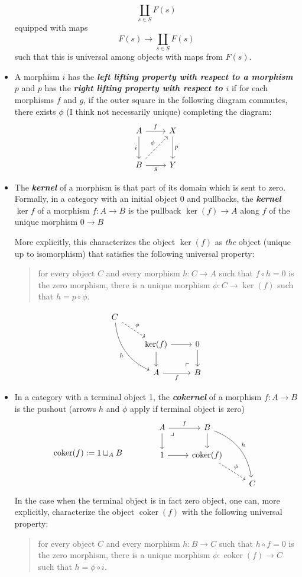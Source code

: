 \documentclass{article}
\numberwithin{equation}{section}
\DeclareMathOperator{\coker}{coker}
\begin{document}
\begin{defn}
\begin{itemize}
\begin{remark}
			\[\coprod_{s\in S}F(s)\]
			equipped with maps
			\[F(s)\to\coprod_{s\in S}F(s)\]
			such that this is universal among objects with maps from $F(s)$.
		\end{remark}
		\item A morphism $i$ has the \textbf{\textit{left lifting property with respect to a morphism $p$}} and $p$ has the \textbf{\textit{right lifting property with respect to $i$}} if for each morphisms $f$ and $g$, if the outer square in the following diagram commutes, there exists $\phi$ (I think not necessarily unique) completing the diagram:
		\[\begin{tikzcd}[row sep=large]
			A\arrow[r,"f"]\arrow[d,"i",swap]&X\arrow[d,"p"]\\
			B\arrow[r,"g",swap]\arrow[ur,dashed,"\phi"]&Y
		\end{tikzcd}\]
		\item The \textbf{\textit{kernel}} of a morphism is that part of its domain which is sent to zero. Formally, in a category with an initial object 0 and pullbacks, the \textbf{\textit{kernel $\ker f$}} of a morphism $f:A\to B$ is the pullback $\ker(f)\to A$ along $f$ of the unique morphism $0\to B$
		
		More explicitly, this characterizes the object $\ker(f)$ as \textit{the} object (unique up to isomorphism) that satisfies the following universal property:
		\begin{quote}
			for every object $C$ and every morphism $h:C\to A$ such that $f\circ h=0$ is the zero morphism, there is a unique morphism $\phi:C\to\ker(f)$ such that $h=p\circ\phi$.
		\end{quote}
		\[\begin{tikzcd}
			C\arrow[dr,dashed,"\phi"]\arrow[ddr,bend right,swap,"h"]\\
			&\ker(f)\arrow[d]\arrow[r]&0\arrow[d]\\
			&A\arrow[r,"f",swap]&B\arrow[ul, phantom, "\ulcorner", very near start]
		\end{tikzcd}\]
		\item In a category with a terminal object 1, the \textbf{\textit{cokernel}} of a morphism $f:A\to B$ is the pushout (arrows $h$ and $\phi$ apply if terminal object is zero)
		\[\coker(f):=1\sqcup_AB\qquad\qquad\begin{tikzcd}
			A\arrow[r,"f"]\arrow[d]\arrow[dr, phantom, "\lrcorner", very near start]&B\arrow[d]\arrow[rdd,bend left,"h"]\\
			1\arrow[r]&\coker(f)\arrow[dr,dashed,"\phi"]\\
			&&C
		\end{tikzcd}\]
		In the case when the terminal object is in fact zero object, one can, more explicitly, characterize the object $\coker(f)$ with the following universal property:
		\begin{quote}
			for every object $C$ and every morphism $h:B\to C$ such that $h\circ f=0$ is the zero morphism, there is a unique morphism $\phi:\coker(f)\to C$ such that $h=\phi\circ i$.
		\end{quote}
		

\end{itemize}
\end{defn}
\end{document}
